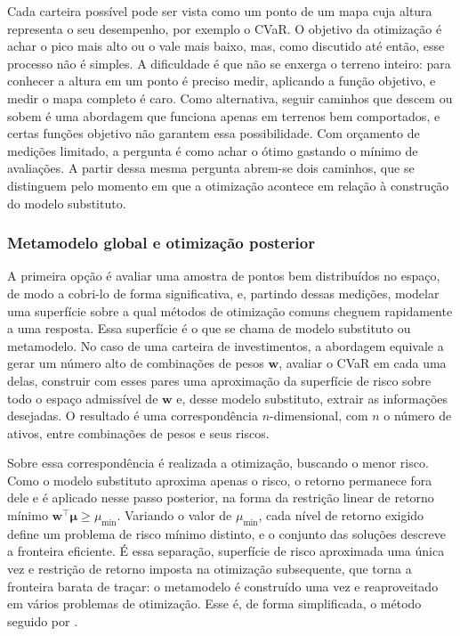 \documentclass[12pt,a4paper]{article}
\begin{document}
Cada carteira possível pode ser vista como um ponto de um mapa cuja altura representa o seu desempenho, por exemplo o CVaR. O objetivo da otimização é achar o pico mais alto ou o vale mais baixo, mas, como discutido até então, esse processo não é simples. A dificuldade é que não se enxerga o terreno inteiro: para conhecer a altura em um ponto é preciso medir, aplicando a função objetivo, e medir o mapa completo é caro. Como alternativa, seguir caminhos que descem ou sobem é uma abordagem que funciona apenas em terrenos bem comportados, e certas funções objetivo não garantem essa possibilidade. Com orçamento de medições limitado, a pergunta é como achar o ótimo gastando o mínimo de avaliações. A partir dessa mesma pergunta abrem-se dois caminhos, que se distinguem pelo momento em que a otimização acontece em relação à construção do modelo substituto.

\subsubsection{Metamodelo global e otimização posterior}

A primeira opção é avaliar uma amostra de pontos bem distribuídos no espaço, de modo a cobri-lo de forma significativa, e, partindo dessas medições, modelar uma superfície sobre a qual métodos de otimização comuns cheguem rapidamente a uma resposta. Essa superfície é o que se chama de modelo substituto ou metamodelo. No caso de uma carteira de investimentos, a abordagem equivale a gerar um número alto de combinações de pesos $\mathbf{w}$, avaliar o CVaR em cada uma delas, construir com esses pares uma aproximação da superfície de risco sobre todo o espaço admissível de $\mathbf{w}$ e, desse modelo substituto, extrair as informações desejadas. O resultado é uma correspondência $n$-dimensional, com $n$ o número de ativos, entre combinações de pesos e seus riscos.

Sobre essa correspondência é realizada a otimização, buscando o menor risco. Como o modelo substituto aproxima apenas o risco, o retorno permanece fora dele e é aplicado nesse passo posterior, na forma da restrição linear de retorno mínimo $\mathbf{w}^\top \boldsymbol{\mu} \geq \mu_{\min}$. Variando o valor de $\mu_{\min}$, cada nível de retorno exigido define um problema de risco mínimo distinto, e o conjunto das soluções descreve a fronteira eficiente. É essa separação, superfície de risco aproximada uma única vez e restrição de retorno imposta na otimização subsequente, que torna a fronteira barata de traçar: o metamodelo é construído uma vez e reaproveitado em vários problemas de otimização. Esse é, de forma simplificada, o método seguido por .
\end{document}
